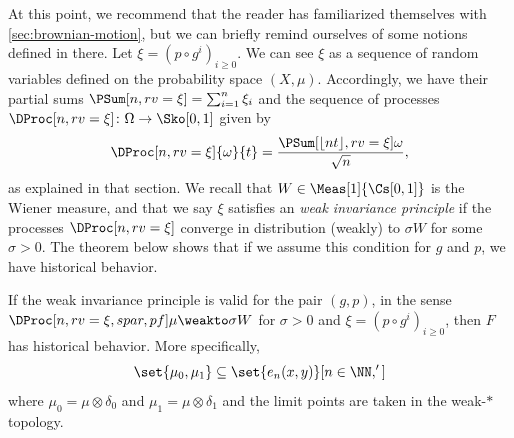 \documentclass[../main]{subfiles}
\begin{document}
At this point, we recommend that the reader has familiarized themselves with \cref{sec:brownian-motion}, but we can briefly remind ourselves of some notions defined in there. Let \(\xi = (p \circ g^{i})_{i \geq 0}\). We can see \(\xi\) as a sequence of random variables defined on the probability space \((X,\mu)\). Accordingly, we have their partial sums \(\PSum[n,rv=\xi] = \sum_{i = 1}^n\xi_i\) and the sequence of processes \(\DProc[n,rv=\xi] \colon \Omega \to \WPS\) given by
\[\DProc[n,rv=\xi]{\omega}{t} = \frac{\PSum[\floor{nt},rv=\xi]{\omega}}{\sqrt{n}},\]
as explained in that section. We recall that \(W \in \Meas[1]{\CWPS}\) is the Wiener measure, and that we say \(\xi\) satisfies an \emph{weak invariance principle} if the processes \(\DProc[n,rv = \xi]\) converge in distribution (weakly) to \(\sigma W\) for some \(\sigma > 0\). The theorem below shows that if we assume this condition for \(g\) and \(p\), we have historical behavior.

\begin{theorem}\label{thm:wip-historical}
  If the weak invariance principle is valid for the pair \((g, p)\), in the sense \(\DProc[n,rv = \xi,spar,pf]\mu \weakto \sigma W\) for \(\sigma > 0\) and \(\xi = (p \circ g^{i})_{i \geq 0}\), then \(F\) has historical behavior. More specifically,
  \begin{equation}\label{eq:emp-closure}
    \set{\mu_0, \mu_1} \subseteq \set{e_n(x,y)}[n \in \NN, ']
  \end{equation}
  where \(\mu_0 = \mu \otimes \delta_{0}\) and \(\mu_1 = \mu \otimes \delta_{1}\) and the limit points are taken in the weak-\(\ast\) topology.
\end{theorem}

\end{document}
